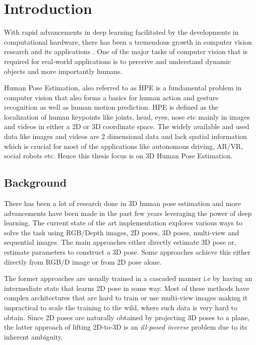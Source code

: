 \chapter{Introduction}
\label{chap:introduction}
With rapid advancements in deep learning facilitated by the developments in computational hardware, there has been a tremendous growth in computer vision research and its applications \cite{AIandCompute}. One of the major tasks of computer vision that is required for real-world applications is to perceive and understand dynamic objects and more importantly humans. 

Human Pose Estimation, also referred to as \ac{HPE} is a fundamental problem in computer vision that also forms a basics for human action and gesture recognition as well as human motion prediction. \ac{HPE} is defined as the localization of human keypoints like joints, head, eyes, nose etc mainly in images and videos in either a 2D or 3D coordinate space. The widely available and used data like images and videos are 2 dimensional data and lack spatial information which is crucial for most of the applications like autonomous driving, \ac{AR/VR}, social robots etc. Hence this thesis focus is on 3D Human Pose Estimation.



\section{Background}
\label{sec:background}

There has been a lot of research done in 3D human pose estimation and more advancements have been made in the past few years leveraging the power of deep learning. The current state of the art implementation explores various ways to solve the task using \ac{RGB}/Depth images, 2D poses, 3D poses, multi-view and sequential images. The main approaches either directly estimate 3D pose or, estimate parameters to construct a 3D pose. Some approaches achieve this either directly from \ac{RGB}/D image or from 2D pose alone.

The former approaches are usually trained in a cascaded manner i.e by having an intermediate state that learns 2D pose in some way. Most of these methods have complex architectures that are hard to train or use multi-view images making it impractical to scale the training to the wild, where such data is very hard to obtain. Since 2D poses are naturally obtained by projecting 3D poses to a plane, the latter approach of lifting 2D-to-3D is an \textit{ill-posed inverse} problem due to its inherent ambiguity. 

